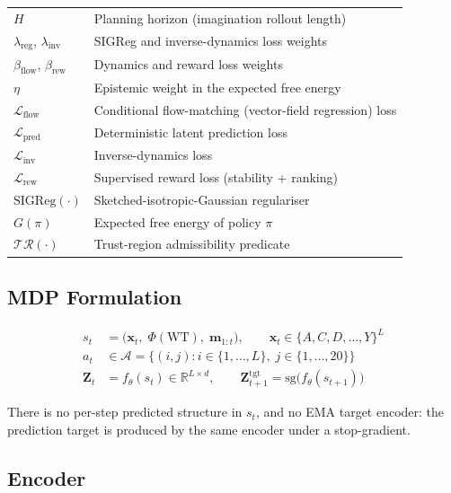 \documentclass[12pt, a4paper]{article}
\begin{document}
\begin{table}[h]
\begin{tabular}{ll}
$H$ & Planning horizon (imagination rollout length) \\
$\lambda_\text{reg}$, $\lambda_\text{inv}$ & SIGReg and inverse-dynamics loss weights \\
$\beta_\text{flow}$, $\beta_\text{rew}$ & Dynamics and reward loss weights \\
$\eta$ & Epistemic weight in the expected free energy \\
$\mathcal{L}_\text{flow}$ & Conditional flow-matching (vector-field regression) loss \\
$\mathcal{L}_\text{pred}$ & Deterministic latent prediction loss \\
$\mathcal{L}_\text{inv}$ & Inverse-dynamics loss \\
$\mathcal{L}_\text{rew}$ & Supervised reward loss (stability + ranking) \\
$\mathrm{SIGReg}(\cdot)$ & Sketched-isotropic-Gaussian regulariser \\
$G(\pi)$ & Expected free energy of policy $\pi$ \\
$\mathcal{T}\!\mathcal{R}(\cdot)$ & Trust-region admissibility predicate \\
\bottomrule
\end{tabular}
\end{table}

\subsection{MDP Formulation}

\begin{align}
    s_t &= \big(\mathbf{x}_t,\; \Phi(\mathrm{WT}),\; \mathbf{m}_{1:t}\big), \qquad \mathbf{x}_t \in \{A, C, D, \ldots, Y\}^L \\
    a_t &\in \mathcal{A} = \{(i, j) : i \in \{1,\ldots,L\},\; j \in \{1,\ldots,20\}\} \\
    \mathbf{Z}_t &= f_\theta(s_t) \in \mathbb{R}^{L \times d}, \qquad \mathbf{Z}_{t+1}^{\text{tgt}} = \mathrm{sg}\big(f_\theta(s_{t+1})\big)
\end{align}

\noindent There is no per-step predicted structure in $s_t$, and no EMA target encoder: the prediction target is produced by the same encoder under a stop-gradient.

\subsection{Encoder}
\end{document}
